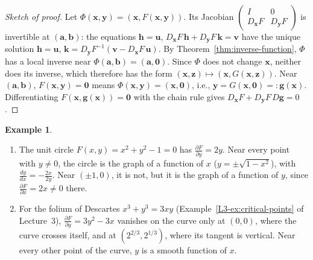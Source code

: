 \documentclass[11pt]{article}
\theoremstyle{definition}
\newtheorem{example}[definition]{Example}
\theoremstyle{plain}
\theoremstyle{remark}
\begin{document}
\begin{proof}[Sketch of proof]
    Let $\Phi(\mathbf{x}, \mathbf{y}) = (\mathbf{x}, F(\mathbf{x}, \mathbf{y}))$. Its Jacobian $\begin{pmatrix} I & 0 \\ D_{\mathbf{x}}F & D_{\mathbf{y}}F \end{pmatrix}$ is invertible at $(\mathbf{a}, \mathbf{b})$: the equations $\mathbf{h} = \mathbf{u}$, $D_{\mathbf{x}}F\,\mathbf{h} + D_{\mathbf{y}}F\,\mathbf{k} = \mathbf{v}$ have the unique solution $\mathbf{h} = \mathbf{u}$, $\mathbf{k} = D_{\mathbf{y}}F^{-1}(\mathbf{v} - D_{\mathbf{x}}F\,\mathbf{u})$. By Theorem~\ref{thm:inverse-function}, $\Phi$ has a local inverse near $\Phi(\mathbf{a}, \mathbf{b}) = (\mathbf{a}, \mathbf{0})$. Since $\Phi$ does not change $\mathbf{x}$, neither does its inverse, which therefore has the form $(\mathbf{x}, \mathbf{z}) \mapsto (\mathbf{x}, G(\mathbf{x}, \mathbf{z}))$. Near $(\mathbf{a}, \mathbf{b})$, $F(\mathbf{x}, \mathbf{y}) = \mathbf{0}$ means $\Phi(\mathbf{x}, \mathbf{y}) = (\mathbf{x}, \mathbf{0})$, i.e., $\mathbf{y} = G(\mathbf{x}, \mathbf{0}) =: \mathbf{g}(\mathbf{x})$. Differentiating $F(\mathbf{x}, \mathbf{g}(\mathbf{x})) = \mathbf{0}$ with the chain rule gives $D_{\mathbf{x}}F + D_{\mathbf{y}}F\,D\mathbf{g} = 0$.
\end{proof}

\begin{example}\label{ex:implicit}
    \begin{enumerate}
        \item The unit circle $F(x, y) = x^2 + y^2 - 1 = 0$ has $\frac{\partial F}{\partial y} = 2y$. Near every point with $y \neq 0$, the circle is the graph of a function of $x$ ($y = \pm\sqrt{1 - x^2}$), with $\frac{dy}{dx} = -\frac{2x}{2y}$. Near $(\pm 1, 0)$, it is not, but it is the graph of a function of $y$, since $\frac{\partial F}{\partial x} = 2x \neq 0$ there.
        \item For the folium of Descartes $x^3 + y^3 = 3xy$ (Example~\ref{L3-ex:critical-points} of Lecture~3), $\frac{\partial F}{\partial y} = 3y^2 - 3x$ vanishes on the curve only at $(0, 0)$, where the curve crosses itself, and at $(2^{2/3}, 2^{1/3})$, where its tangent is vertical. Near every other point of the curve, $y$ is a smooth function of $x$.
    \end{enumerate}
\end{example}
\end{document}
